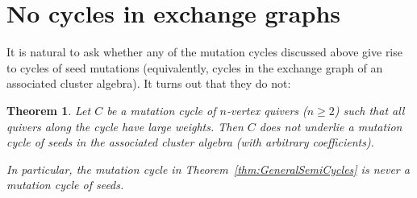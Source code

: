 \documentclass[11pt, letterpaper]{amsart}
\newtheorem{theorem}{Theorem}[section]
\theoremstyle{definition}
\numberwithin{equation}{section}
\begin{document}
\section{No cycles in exchange graphs}
\label{sec:no-seed-cycles}

It is natural to ask whether any of the mutation cycles discussed above give rise to cycles of seed mutations
(equivalently, cycles in the exchange graph of an associated cluster algebra). 
It turns out that they do not: 

\begin{theorem}
\label{th:no-seed-cycle}
Let $C$ be a mutation cycle of $n$-vertex quivers ($n\geq 2$) such that all quivers along the cycle have large weights. 
Then $C$ does not underlie a mutation cycle of seeds in the associated cluster algebra (with arbitrary coefficients).

In particular, the mutation cycle in Theorem~\ref{thm:GeneralSemiCycles} is never a mutation cycle of seeds.
\end{theorem}
\end{document}
